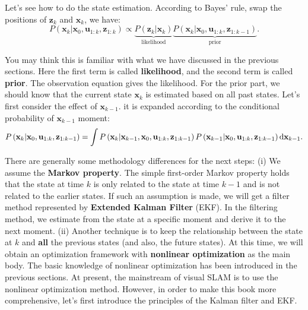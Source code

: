 Let's see how to do the state estimation. According to Bayes' rule, swap the positions of $\mathbf{z}_k$ and $\mathbf{x}_k$, we have:
\begin{equation}
	\label{eq:10-5}
	P\left( {{\mathbf{x}_k}|{\mathbf{x}_0},{\mathbf{u}_{1:k}},{\mathbf{z}_{1:k}}} \right) \propto \underbrace{P\left( {{\mathbf{z}_k}|{\mathbf{x}_k}} \right)}_{\text{likelihood}} \underbrace{P\left( {{\mathbf{x}_k}|{\mathbf{x}_0},{\mathbf{u}_{1:k}},{\mathbf{z}_{1:k - 1}}} \right)}_{\text{prior}}.
\end{equation}

You may think this is familiar with what we have discussed in the previous sections. Here the first term is called \textbf{likelihood}, and the second term is called \textbf{prior}. The observation equation gives the likelihood. For the prior part, we should know that the current state $\mathbf{x}_k$ is estimated based on all past states. Let's first consider the effect of $\mathbf{x}_{k-1}$. it is expanded according to the conditional probability of $\mathbf{x}_{k-1}$ moment:
\begin{equation}
	\label{eq:bayes-estimator}
	\small
	P\left( {{\mathbf{x}_k}|{\mathbf{x}_0},{\mathbf{u}_{1:k}},{\mathbf{z}_{1:k - 1}}} \right) = \int {P\left( {{\mathbf{x}_k}|{\mathbf{x}_{k - 1}},{\mathbf{x}_0},{\mathbf{u}_{1:k}},{\mathbf{z}_{1:k - 1}}} \right)P\left( {{\mathbf{x}_{k - 1}}|{\mathbf{x}_0},{\mathbf{u}_{1:k}},{\mathbf{z}_{1:k - 1}}} \right) \mathrm{d}\mathbf{x}_{k-1} }.
\end{equation}

There are generally some methodology differences for the next steps: (i) We assume the \textbf{Markov property}. The simple first-order Markov property holds that the state at time $k$ is only related to the state at time $k-1$ and is not related to the earlier states. If such an assumption is made, we will get a filter method represented by \textbf{Extended Kalman Filter} (EKF). In the filtering method, we estimate from the state at a specific moment and derive it to the next moment. (ii) Another technique is to keep the relationship between the state at $k$ and \textbf{all} the previous states (and also, the future states). At this time, we will obtain an optimization framework with \textbf{nonlinear optimization} as the main body. The basic knowledge of nonlinear optimization has been introduced in the previous sections. At present, the mainstream of visual SLAM is to use the nonlinear optimization method. However, in order to make this book more comprehensive, let's first introduce the principles of the Kalman filter and EKF.

